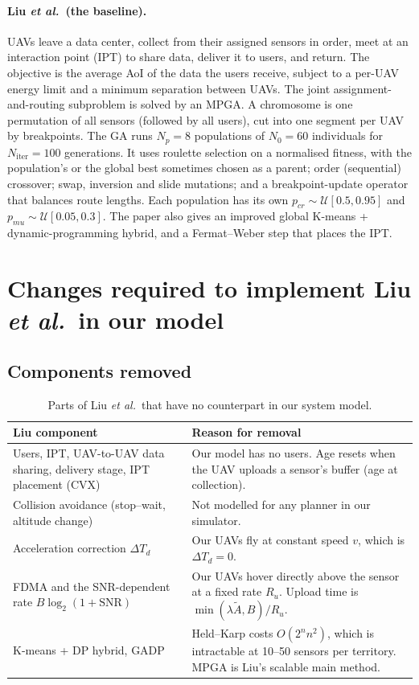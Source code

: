 \documentclass[10pt,a4paper]{article}
\begin{document}
\paragraph{Liu \emph{et al.}\ (the baseline).}
UAVs leave a data center, collect from their assigned sensors in order, meet at an interaction point
(IPT) to share data, deliver it to users, and return. The objective is the average AoI of the data the
users receive, subject to a per-UAV energy limit and a minimum separation between UAVs. The joint
assignment-and-routing subproblem is solved by an MPGA. A chromosome is one permutation of all sensors
(followed by all users), cut into one segment per UAV by breakpoints. The GA runs $N_p=8$ populations of
$N_0=60$ individuals for $N_{\mathrm{iter}}=100$ generations. It uses roulette selection on a normalised
fitness, with the population's or the global best sometimes chosen as a parent; order (sequential)
crossover; swap, inversion and slide mutations; and a breakpoint-update operator that balances route
lengths. Each population has its own $p_{cr}\sim\mathcal U[0.5,0.95]$ and $p_{mu}\sim\mathcal U[0.05,0.3]$.
The paper also gives an improved global K-means + dynamic-programming hybrid, and a Fermat--Weber
step that places the IPT.

\section{Changes required to implement Liu \emph{et al.}\ in our model}

\subsection{Components removed}
\begin{table}[H]\centering\small
\begin{tabularx}{\linewidth}{>{\raggedright\arraybackslash}p{5.2cm}L}
\toprule
Liu component & Reason for removal\\
\midrule
Users, IPT, UAV-to-UAV data sharing, delivery stage, IPT placement (CVX) & Our model has no users. Age resets when the UAV uploads a sensor's buffer (age at collection).\\
Collision avoidance (stop--wait, altitude change) & Not modelled for any planner in our simulator.\\
Acceleration correction $\Delta T_d$ & Our UAVs fly at constant speed $v$, which is $\Delta T_d=0$.\\
FDMA and the SNR-dependent rate $B\log_2(1+\mathrm{SNR})$ & Our UAVs hover directly above the sensor at a fixed rate $R_u$. Upload time is $\min(\lambda\tilde A,B)/R_u$.\\
K-means + DP hybrid, GADP & Held--Karp costs $O(2^n n^2)$, which is intractable at 10--50 sensors per territory. MPGA is Liu's scalable main method.\\
\bottomrule
\end{tabularx}
\caption{Parts of Liu \emph{et al.}\ that have no counterpart in our system model.}
\end{table}
\end{document}
